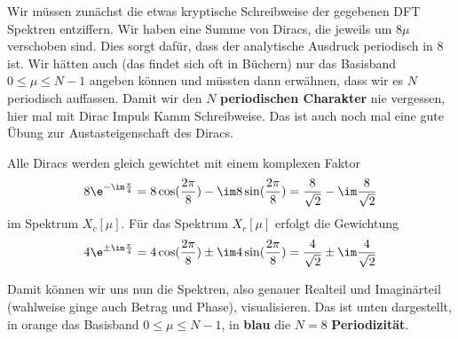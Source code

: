 \begin{ExCalc}
%
Wir müssen zunächst die etwas kryptische Schreibweise der gegebenen DFT
Spektren entziffern.
Wir haben eine Summe von Diracs, die jeweils um $8\mu$ verschoben sind. Dies
sorgt dafür, dass der analytische Ausdruck periodisch in 8 ist. Wir hätten auch
(das findet sich oft in Büchern) nur das Basisband $0\leq \mu \leq N-1$ angeben
können und müssten dann erwähnen, dass wir es $N$ periodisch auffassen.
%
Damit wir den $N$ \textbf{periodischen Charakter} nie vergessen, hier mal mit Dirac
Impuls Kamm Schreibweise. Das ist auch noch mal eine gute Übung zur
Austasteigenschaft des Diracs.

Alle Diracs werden gleich gewichtet mit einem komplexen Faktor
\begin{align}
8 \e^{-\im\frac{\pi}{4}}  = 8 \cos(\frac{2\pi}{8}) - \im 8 \sin(\frac{2\pi}{8})=
\frac{8}{\sqrt{2}} - \im \frac{8}{\sqrt{2}}
\end{align}
im Spektrum $X_c[\mu]$.
%
Für das Spektrum $X_r[\mu]$ erfolgt die Gewichtung
\begin{align}
4 \e^{\pm\im\frac{\pi}{4}}  = 4 \cos(\frac{2\pi}{8}) \pm \im 4 \sin(\frac{2\pi}{8})=
\frac{4}{\sqrt{2}} \pm \im \frac{4}{\sqrt{2}}
\end{align}

Damit können wir uns nun die Spektren, also genauer Realteil und Imaginärteil
(wahlweise ginge auch Betrag und Phase), visualisieren. Das ist unten dargestellt,
in orange das Basisband $0\leq \mu \leq N-1$, in \textbf{blau} die $N=8$ \textbf{Periodizität}.


\end{ExCalc}

